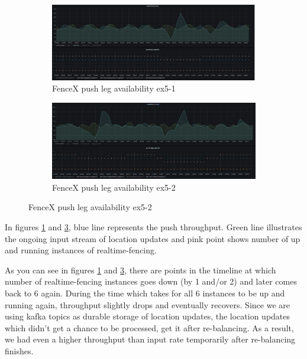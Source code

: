 \documentclass[a4]{report}
\begin{document}
    \begin{figure}
        \centering
        \begin{subfigure}[b]{\textwidth}
            \centering
            \caption{FenceX push leg availability ex5-1}
            \label{fig:ex5-1}
            \includegraphics[width=\textwidth, height=0.3\textheight, scale=2]{images/evaluation/ex5-benchmarking-ongoing-2per6sec.png}
        \end{subfigure}

        \begin{subfigure}[b]{\textwidth}
            \centering
            \caption{FenceX push leg availability ex5-2}
            \label{fig:ex5-2}
            \includegraphics[width=\textwidth, height=0.3\textheight, scale=2]{images/evaluation/ex5-benchmarking-ongoing-2per7sec.png}
        \end{subfigure}
    \end{figure}

    \clearpage

    In figures \ref{fig:ex5-1} and \ref{fig:ex5-2}, blue line represents the push throughput.
    Green line illustrates the ongoing input stream of location updates and pink point shows
    number of up and running instances of realtime-fencing.

    As you can see in figures \ref{fig:ex5-1} and \ref{fig:ex5-2}, there are points in the timeline at which number of
    realtime-fencing instances goes down (by 1 and/or 2) and later comes back to 6 again.
    During the time which takes for all 6 instances to be up and running again, throughput slightly drops and
    eventually recovers.
    Since we are using kafka topics as durable storage of location updates, the location updates which
    didn't get a chance to be processed, get it after re-balancing.
    As a result, we had even a higher throughput than input rate temporarily after re-balancing finishes.
\end{document}
